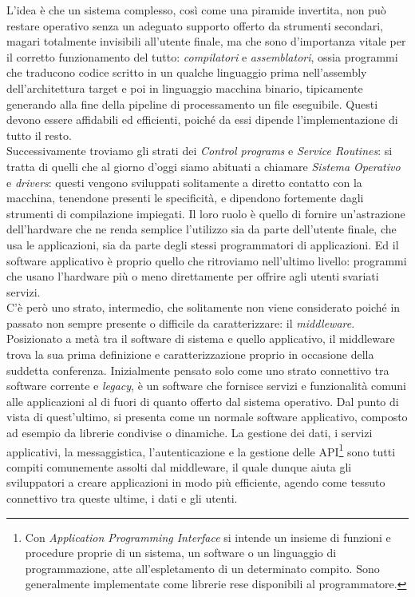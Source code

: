L'idea è che un sistema complesso, così come una piramide invertita, non può restare operativo senza un adeguato supporto offerto da strumenti secondari, magari totalmente invisibili all'utente finale, ma che sono d'importanza vitale per il corretto funzionamento del tutto: \emph{compilatori} e \emph{assemblatori}, ossia programmi che traducono codice scritto in un qualche linguaggio prima nell'assembly dell'architettura target e poi in linguaggio macchina binario, tipicamente generando alla fine della pipeline di processamento un file eseguibile. Questi devono essere affidabili ed efficienti, poiché da essi dipende l'implementazione di tutto il resto.\\
Successivamente troviamo gli strati dei \emph{Control programs} e \emph{Service Routines}: si tratta di quelli che al giorno d'oggi siamo abituati a chiamare \emph{Sistema Operativo} e \emph{drivers}: questi vengono sviluppati solitamente a diretto contatto con la macchina, tenendone presenti le specificità, e dipendono fortemente dagli strumenti di compilazione impiegati. Il loro ruolo è quello di fornire un'astrazione dell'hardware che ne renda semplice l'utilizzo sia da parte dell'utente finale, che usa le applicazioni, sia da parte degli stessi programmatori di applicazioni. Ed il software applicativo è proprio quello che ritroviamo nell'ultimo livello: programmi che usano l'hardware più o meno direttamente per offrire agli utenti svariati servizi.\\
C'è però uno strato, intermedio, che solitamente non viene considerato poiché in passato non sempre presente o difficile da caratterizzare: il \emph{middleware}. Posizionato a metà tra il software di sistema e quello applicativo, il middleware trova la sua prima definizione e caratterizzazione proprio in occasione della suddetta conferenza. Inizialmente pensato solo come uno strato connettivo tra software corrente e \emph{legacy}, è un software che fornisce servizi e funzionalità comuni alle applicazioni al di fuori di quanto offerto dal sistema operativo. Dal punto di vista di quest’ultimo, si presenta come un normale software applicativo, composto ad esempio da librerie condivise o dinamiche. La gestione dei dati, i servizi applicativi, la messaggistica, l'autenticazione e la gestione delle API\footnote{Con \emph{Application Programming Interface} si intende un insieme di funzioni e procedure proprie di un sistema, un software o un linguaggio di programmazione, atte all'espletamento di un determinato compito. Sono generalmente implementate come librerie rese disponibili al programmatore.} sono tutti compiti comunemente assolti dal middleware, il quale dunque aiuta gli sviluppatori a creare applicazioni in modo più efficiente, agendo come tessuto connettivo tra queste ultime, i dati e gli utenti.\vfill\newpage
